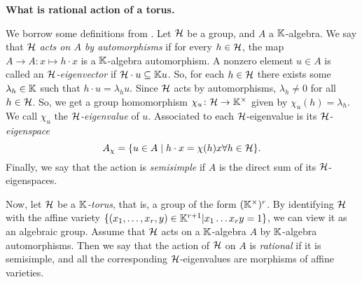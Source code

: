 \textbf{What is rational action of a torus.}

We borrow some definitions from \cite{GoodearlBrown2002LecturesAQC}. Let $\mathcal{H}$ be a
group, and $A$ a $\mathbb{K}$-algebra. We say that $\mathcal{H}$ \emph{acts on $A$ by
	automorphisms} if for every $h \in \mathcal{H}$, the map $A \to
	A \colon x \mapsto h \cdot x$ is a $\mathbb{K}$-algebra automorphism. A nonzero element $u
	\in A$ is called an \emph{$\mathcal{H}$-eigenvector} if $\mathcal{H}
	\cdot u \subseteq \mathbb{K} u$. So, for each $h \in \mathcal{H}$ there exists some $\lambda_h \in
	\mathbb{K}$ such that $h \cdot u = \lambda_h u$. Since $\mathcal{H}$ acts by automorphisms,
$\lambda_h \neq 0$ for all $h \in \mathcal{H}$. So, we get a group homomorphism $\chi_u \colon
	\mathcal{H} \to \mathbb{K}^\times$ given by $\chi_u(h) = \lambda_h$. We call $\chi_u$ the
\emph{$\mathcal{H}$-eigenvalue} of $u$. Associated to each
$\mathcal{H}$-eigenvalue is its \emph{$\mathcal{H}$-eigenspace}
\begin{equation*}
	A_\chi = \{u \in A \mid h \cdot x = \chi(h)x \forall h \in \mathcal{H} \}.
\end{equation*}
%
Finally, we say that the action is \emph{semisimple} if $A$ is
the direct sum of its $\mathcal{H}$-eigenspaces.

Now, let $\mathcal{H}$ be a \emph{$\mathbb{K}$-torus}, that is, a group of the form
$(\mathbb{K}^\times)^r$. By identifying $\mathcal{H}$ with the affine variety $\{(x_1, \dots, x_r,
	y) \in \mathbb{K}^{r+1} | x_1 \dots x_r y = 1\}$, we can view it as an algebraic group.
Assume that $\mathcal{H}$ acts on a $\mathbb{K}$-algebra $A$ by $\mathbb{K}$-algebra automorphisms. Then
we say that the action of $\mathcal{H}$ on $A$ is \emph{rational} if it
is semisimple, and all the corresponding $\mathcal{H}$-eigenvalues are morphisms of affine
varieties.

